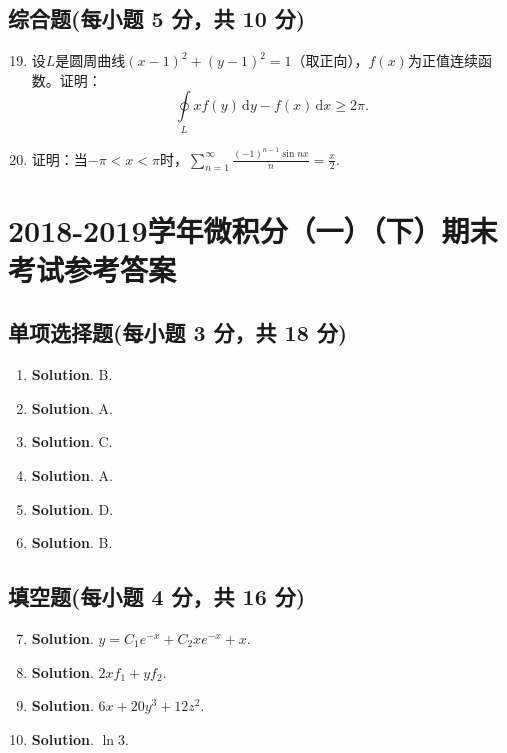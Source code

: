 \documentclass[../Main.tex]{subfiles}
\begin{document}
\section{综合题(每小题 5 分，共 10 分)}
\begin{enumerate}
    \setcounter{enumi}{18}
    \item 设$L$是圆周曲线$(x-1)^{2}+(y-1)^{2}=1$（取正向），$f(x)$为正值连续函数。证明：
          \[
              \oint\limits_{L}xf(y)\,\mathrm{d}y-f(x)\,\mathrm{d}x\geq2\pi.
          \]
          \vspace{10em}

    \item 证明：当$-\pi<x<\pi$时，$\sum_{n=1}^{\infty}\frac{(-1)^{n-1}\sin nx}{n}=\frac{x}{2}$.
          \vspace{10em}
\end{enumerate}

\chapter{2018-2019学年微积分（一）（下）期末考试参考答案}
\section{单项选择题(每小题 3 分，共 18 分)}
\begin{enumerate}
    \item \textbf{Solution}. B.
    \item \textbf{Solution}. A.
    \item \textbf{Solution}. C.
    \item \textbf{Solution}. A.
    \item \textbf{Solution}. D.
    \item \textbf{Solution}. B.
\end{enumerate}

\section{填空题(每小题 4 分，共 16 分)}
\begin{enumerate}
    \setcounter{enumi}{6}
    \item \textbf{Solution}. $y=C_{1}e^{-x}+C_{2}xe^{-x}+x$.
    \item \textbf{Solution}. $2xf_{1}+yf_{2}$.
    \item \textbf{Solution}. $6x+20y^{3}+12z^{2}$.
    \item \textbf{Solution}. $\ln3$.
\end{enumerate}
\end{document}
